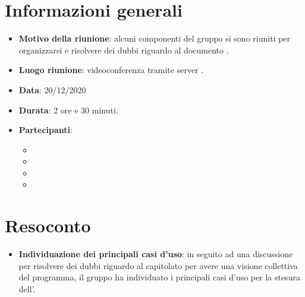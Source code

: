 \section{Informazioni generali}
\begin{itemize}
\item \textbf{Motivo della riunione}: alcuni componenti del gruppo si sono riuniti per organizzarsi e risolvere dei dubbi riguardo al documento \AdR.
\item \textbf{Luogo riunione}: videoconferenza tramite server .
\item \textbf{Data}: 20/12/2020
\item \textbf{Durata}: 2 ore e 30 minuti.
\item \textbf{Partecipanti}:
	\begin{itemize}
	\item \BM{}
	\item \SG{}
	\item \SP{}
	\item \SH{}
	\end{itemize}
\end{itemize}
\newpage
\section{Resoconto}
\begin{itemize}
\item \textbf{Individuazione dei principali casi d'uso}: in seguito ad una discussione per risolvere dei dubbi riguardo al capitolato per avere una visione collettiva del programma, il gruppo ha individuato i principali casi d'uso per la stesura dell'\AdR.
\end{itemize}